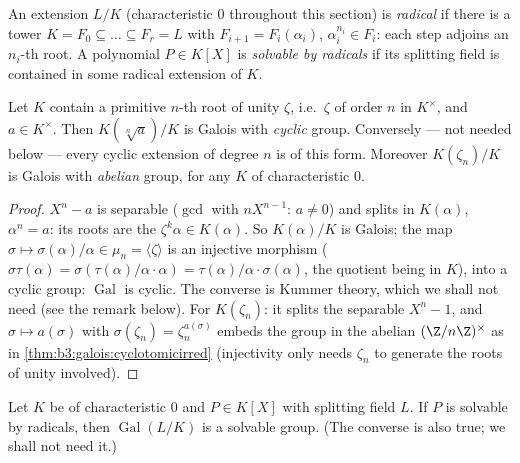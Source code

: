 \begin{definition}\label{def:b3:galois:radical}
An extension $L/K$ (characteristic $0$ throughout this section)
is \emph{radical} if there is a tower $K = F_0 \subseteq \dots
\subseteq F_r = L$ with $F_{i+1} = F_i(\alpha_i)$,
$\alpha_i^{n_i} \in F_i$: each step adjoins an $n_i$-th root. A
polynomial $P \in K[X]$ is \emph{solvable by
radicals} if its splitting field is
contained in some radical extension of $K$.
\end{definition}

\begin{lemma}\label{lem:b3:galois:cyclicsteps}
Let $K$ contain a primitive $n$-th root of unity $\zeta$, i.e.\
$\zeta$ of order $n$ in $K^\times$, and $a \in K^\times$. Then
$K(\sqrt[n]a)/K$ is Galois with \emph{cyclic} group. Conversely
--- not needed below --- every cyclic extension of degree $n$ is
of this form. Moreover $K(\zeta_n)/K$ is Galois with
\emph{abelian} group, for any $K$ of characteristic $0$.
\end{lemma}

\begin{proof}
$X^n - a$ is separable ($\gcd$ with $nX^{n-1}$: $a \neq 0$) and
splits in $K(\alpha)$, $\alpha^n = a$: its roots are the
$\zeta^k\alpha \in K(\alpha)$. So $K(\alpha)/K$ is Galois; the
map $\sigma \mapsto \sigma(\alpha)/\alpha \in \mu_n = \langle
\zeta\rangle$ is an injective morphism ($\sigma\tau(\alpha) =
\sigma(\tau(\alpha)/\alpha \cdot \alpha) =
\tau(\alpha)/\alpha\cdot\sigma(\alpha)$, the quotient being in
$K$), into a cyclic group: $\operatorname{Gal}$ is cyclic. The
converse is Kummer theory, which we shall not need (see the
remark below). For $K(\zeta_n)$: it splits the separable $X^n -
1$, and $\sigma \mapsto a(\sigma)$ with $\sigma(\zeta_n) =
\zeta_n^{a(\sigma)}$ embeds the group in the abelian
$(\Z/n\Z)^\times$ as in \cref{thm:b3:galois:cyclotomicirred}
(injectivity only needs $\zeta_n$ to generate the roots of
unity involved).
\end{proof}

\begin{theorem}[Galois]\label{thm:b3:galois:solvable}
Let $K$ be of characteristic $0$ and $P \in K[X]$ with splitting
field $L$. If $P$ is solvable by radicals, then
$\operatorname{Gal}(L/K)$ is a solvable group. (The converse is
also true; we shall not need it.)
\end{theorem}

